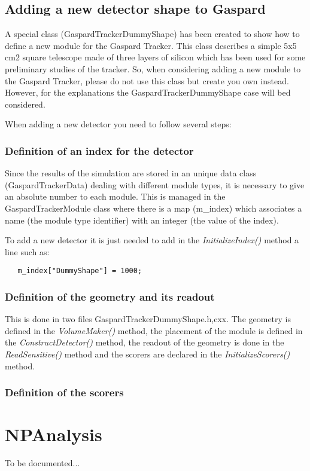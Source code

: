 \documentclass[a4paper,12pt]{article}
\begin{document}
\subsection{Adding a new detector shape to Gaspard}
A special class (GaspardTrackerDummyShape) has been created to show how
to define a new module for the Gaspard Tracker. This class describes a
simple 5x5 cm2 square telescope made of three layers of silicon which  
has been used for some preliminary studies of the tracker. So, when 
considering adding a new module to the Gaspard Tracker, please do not use
this class but create you own instead. However, for the explanations the 
GaspardTrackerDummyShape case will bed considered.

When adding a new detector you need to follow several steps:

\subsubsection{Definition of an index for the detector}
Since the results of the simulation are stored in an unique data class 
(GaspardTrackerData) dealing with different module types, it is 
necessary to give an absolute number to each module. This is managed in
the GaspardTrackerModule class where there is a map (m\_index) which
associates a name (the module type identifier) with an integer (the value 
of the index).

To add a new detector it is just needed to add in the {\it InitializeIndex()}
method a line such as:

\begin{verbatim}
   m_index["DummyShape"] = 1000;
\end{verbatim}

\subsubsection{Definition of the geometry and its readout}
This is done in two files GaspardTrackerDummyShape.{h,cxx}. The geometry 
is defined in the {\it VolumeMaker()} method, the placement of the 
module is defined in the {\it ConstructDetector()} method, the readout
of the geometry is done in the {\it ReadSensitive()} method and the 
scorers are declared in the {\it InitializeScorers()} method.

\subsubsection{Definition of the scorers}


\section{NPAnalysis}
To be documented...
\end{document}
